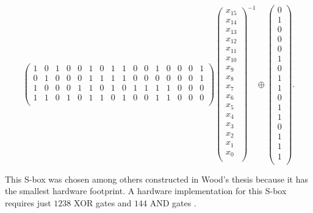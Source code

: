 \begin{equation*}
\begin{pmatrix}
1 & 0 & 1 & 0 & 0 & 1 & 0 & 1 & 1 & 0 & 0 & 1 & 0 & 0 & 0 & 1 \\
0 & 1 & 0 & 0 & 0 & 1 & 1 & 1 & 1 & 0 & 0 & 0 & 0 & 0 & 0 & 1 \\
1 & 0 & 0 & 0 & 1 & 1 & 0 & 1 & 0 & 1 & 1 & 1 & 1 & 0 & 0 & 0 \\
1 & 1 & 0 & 1 & 0 & 1 & 1 & 0 & 1 & 0 & 0 & 1 & 1 & 0 & 0 & 0 \\
\end{pmatrix}
\begin{pmatrix}
x_{15} \\
x_{14} \\
x_{13} \\
x_{12} \\
x_{11} \\
x_{10} \\
x_{9} \\
x_{8} \\
x_{7} \\
x_{6} \\
x_{5} \\
x_{4} \\
x_{3} \\
x_{2} \\
x_{1} \\
x_{0} \\
\end{pmatrix}
^{-1}
\oplus
\begin{pmatrix}
0 \\
1 \\
0 \\
0 \\
0 \\
1 \\
0 \\
1 \\
1 \\
0 \\
1 \\
1 \\
0 \\
1 \\
1 \\
1 \\
\end{pmatrix}.
\end{equation*}
\normalsize

This S-box was chosen among others constructed in Wood's thesis because it has the smallest hardware footprint.
A hardware implementation for this S-box requires just $1238$ XOR gates and $144$ AND gates \cite{Wood2013_SboxThesis}.

